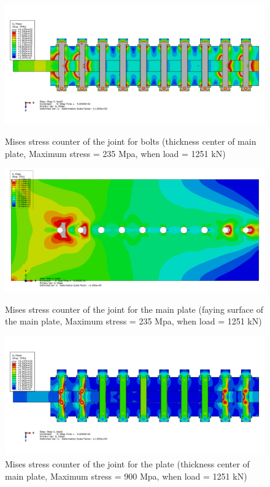 \begin{figure}[htbp]
    \centering
    \begin{minipage}[t]{0.8\textwidth}
    \includegraphics[width=\linewidth]{imgs/ch7/beafst-count-p.png}
    \caption{Mises stress counter of the joint for bolts (thickness center of main plate, Maximum stress = 235 Mpa, when load = 1251 kN)}
    \label{fig-beafstcp}
    \end{minipage}
    \begin{minipage}[t]{0.8\textwidth}
    \includegraphics[width=\linewidth]{imgs/ch7/beafst-scout-mp.png}
    \caption{Mises stress counter of the joint for the main plate (faying surface of the main plate, Maximum stress = 235 Mpa, when load = 1251 kN)}
    \label{fig-beafstcp-2}
    \end{minipage}
    \begin{minipage}[t]{0.8\textwidth}
    \includegraphics[width=\linewidth]{imgs/ch7/beafst-count-b.png}
    \caption{Mises stress counter of the joint for the plate (thickness center of main plate, Maximum stress = 900 Mpa, when load = 1251 kN)}
    \label{fig-beafstcb}
    \end{minipage}
    \label{fig-beafstc}
\end{figure}



